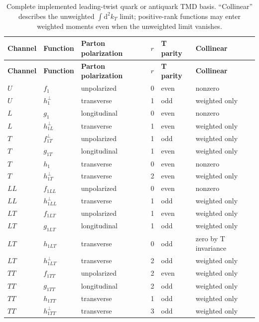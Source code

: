 \documentclass[11pt,oneside]{book}
\newcommand{\dd}{\mathrm{d}}
\begin{document}
\begin{longtable}{llllll}
\caption{Complete implemented leading-twist quark or antiquark TMD basis.  ``Collinear'' describes the unweighted $\int\dd^2k_T$ limit; positive-rank functions may enter weighted moments even when the unweighted limit vanishes.}\label{tab:quark-inventory}\\
\toprule
\textbf{Channel}&\textbf{Function}&\textbf{Parton polarization}&$r$&\textbf{T parity}&\textbf{Collinear}\\
\midrule
\endfirsthead
\toprule
\textbf{Channel}&\textbf{Function}&\textbf{Parton polarization}&$r$&\textbf{T parity}&\textbf{Collinear}\\
\midrule
\endhead
$U$  &$f_1$                 &unpolarized&0&even&nonzero\\
$U$  &$h_1^\perp$           &transverse &1&odd &weighted only\\
$L$  &$g_1$                 &longitudinal&0&even&nonzero\\
$L$  &$h_{1L}^\perp$        &transverse&1&even&weighted only\\
$T$  &$f_{1T}^\perp$        &unpolarized&1&odd&weighted only\\
$T$  &$g_{1T}$              &longitudinal&1&even&weighted only\\
$T$  &$h_1$                 &transverse&0&even&nonzero\\
$T$  &$h_{1T}^\perp$        &transverse&2&even&weighted only\\
$LL$ &$f_{1LL}$             &unpolarized&0&even&nonzero\\
$LL$ &$h_{1LL}^\perp$       &transverse&1&odd&weighted only\\
$LT$ &$f_{1LT}$             &unpolarized&1&even&weighted only\\
$LT$ &$g_{1LT}$             &longitudinal&1&odd&weighted only\\
$LT$ &$h_{1LT}$             &transverse&0&odd&zero by T invariance\\
$LT$ &$h_{1LT}^\perp$       &transverse&2&odd&weighted only\\
$TT$ &$f_{1TT}$             &unpolarized&2&even&weighted only\\
$TT$ &$g_{1TT}$             &longitudinal&2&odd&weighted only\\
$TT$ &$h_{1TT}$             &transverse&1&odd&weighted only\\
$TT$ &$h_{1TT}^\perp$       &transverse&3&odd&weighted only\\
\bottomrule
\end{longtable}
\end{document}
